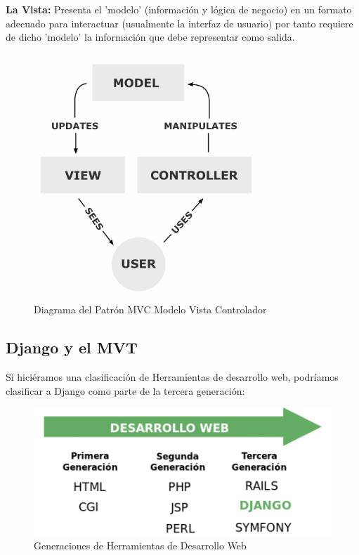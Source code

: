 {\bfseries La Vista:} Presenta el 'modelo' (información y lógica de negocio)  en un formato adecuado para interactuar (usualmente la interfaz de usuario)  por tanto requiere de dicho 'modelo' la información que debe representar como  salida.\\[0.1cm]


\begin{figure}[h]
    \centering
    \includegraphics[scale=0.7]{resourse/MVC-Process.png}
    \caption{Diagrama del Patrón MVC Modelo Vista Controlador}
    \label{fig:03}
\end{figure}    


\subsection{Django y el MVT}

Si hiciéramos una clasificación de Herramientas de desarrollo web, podríamos clasificar a Django como parte de la tercera generación:


\begin{figure}[h]
    \centering
    \includegraphics[scale=0.7]{resourse/desarrolloweb.png}
    \caption{Generaciones de Herramientas de Desarrollo Web}
    \label{fig:02}
\end{figure}   

